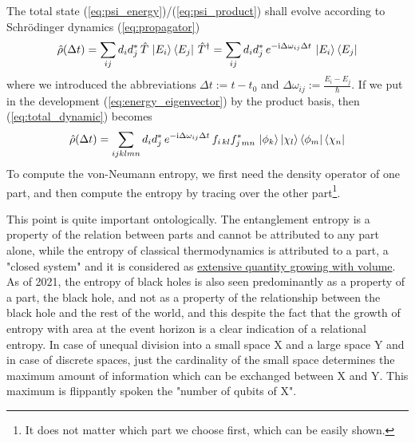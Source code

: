 \documentclass[12pt]{article}
\begin{document}
The total state (\ref{eq:psi_energy})/(\ref{eq:psi_product}) shall evolve according to Schrödinger dynamics (\ref{eq:propagator})
\begin{equation}
\label{eq:total_dynamic}
\hat{\rho}(\Delta t)=\sum_{ij}d_{i}d_{j}^*\, \hat{T}\, \ket{E_i}\bra{E_j}\, {\hat{T}}^\dagger
= \sum_{ij}d_{i}d_{j}^*\, e^{-\mathrm i \Delta\omega_{ij}\Delta t}\, \ket{E_i}\bra{E_j}
\end{equation}
where we introduced the abbreviations $\Delta t := t-t_0$ and $\Delta \omega_{ij} := \frac{E_i - E_j}{\hbar}$. If we put in the development (\ref{eq:energy_eigenvector}) by the product basis, then (\ref{eq:total_dynamic}) becomes 
\begin{equation*}
\hat{\rho}(\Delta t) = \sum_{ijklmn}d_{i}d_{j}^*\, e^{-\mathrm i \Delta\omega_{ij}\Delta t}\, 
f_{i\,kl}f_{j\,mn}^*\, \ket{\phi_k}\ket{\chi_l}\bra{\phi_m}\bra{\chi_n}
\end{equation*}
To compute the von-Neumann entropy, we first need the density operator of one part, and then compute the entropy by tracing over the other part\footnote{It does not matter which part we choose first, which can be easily shown.}.

This point is quite important ontologically. The entanglement entropy is a property of the relation between parts and cannot be attributed to any part alone, while the entropy of classical thermodynamics is attributed to a part, a "closed system" and it is considered as \href{https://de.wikipedia.org/wiki/Extensive_Gr%C3%B6%C3%9Fe}{extensive quantity growing with volume}. As of 2021, the entropy of black holes is also seen predominantly as a property of a part, the black hole, and not as a property of the relationship between the black hole and the rest of the world, and this despite the fact that the growth of entropy with area at the event horizon is a clear indication of a relational entropy. In case of unequal division into a small space X and a large space Y and in case of discrete spaces, just the cardinality of the small space determines the maximum amount of information which can be exchanged between X and Y. This maximum is flippantly spoken the "number of qubits of X".
\end{document}
